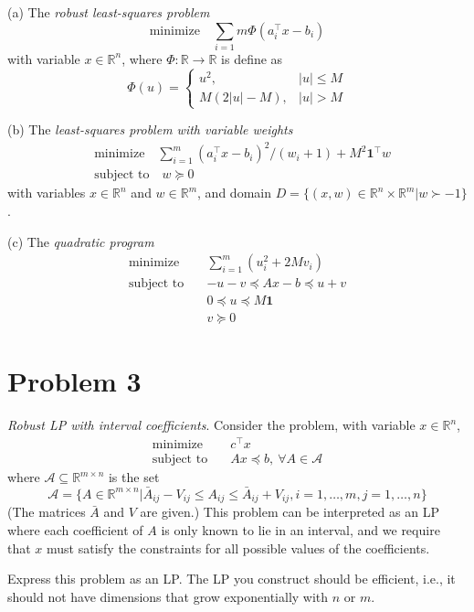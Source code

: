 \documentclass[11pt]{article}
\newcommand{\RR}{\mathbb{R}}
\newcommand{\T}{^\top}
\begin{document}
(a) The \textit{robust least-squares problem}
\[
\text{minimize}\quad \sum_{i=1}{m} \Phi(a\T_i x - b_i)
\]
with variable $x\in\RR^n$, where $\Phi:\RR \rightarrow \RR$ is define as
\[
  \Phi(u)= 
  \begin{cases}
    u^2, & |u| \leq M \\ 
    M (2|u| - M), & |u| > M
  \end{cases}
\]

(b) The \textit{least-squares problem with variable weights}
\begin{align*}
  &\text{minimize}\quad \sum_{i=1}^{m} (a\T_i x - b_i)^2 / (w_i + 1) + M^2 \mathbf{1}\T w\\
  &\text{subject to}\quad w\succeq 0
\end{align*}
with variables $x\in\RR^n$ and $w\in\RR^m$, and domain $D = \{(x, w) \in\RR^n\times \RR^m | w\succ -1\}$.


(c) The \textit{quadratic program}
\begin{align*}
  \text{minimize}\quad &\sum_{i=1}^{m}(u_i^2 + 2Mv_i)\\
  \text{subject to}\quad &-u -v \preceq Ax - b \preceq u+v\\
  & 0 \preceq u \preceq M \mathbf{1}\\
  & v \succeq 0
\end{align*}


\clearpage
\section*{Problem 3}
\textit{Robust LP with interval coefficients}. Consider the problem, with variable $x\in\RR^n$,
\begin{align*}
  \text{minimize}\quad &c\T x\\
  \text{subject to}\quad & Ax\preceq b, \ \forall A\in \mathcal{A}
\end{align*}
where $\mathcal{A} \subseteq \RR^{m\times n}$ is the set
\[
\mathcal{A} = \{A\in \RR^{m\times n} | \bar A_{ij} - V_{ij} \leq A_{ij} \leq \bar A_{ij} + V_{ij}, i = 1, \dots, m, j = 1, \dots, n\}
\]
(The matrices $\bar A$ and $V$ are given.) This problem can be interpreted as an LP where each coefficient of $A$ is only known to lie in an interval, and we require that $x$ must satisfy the constraints for all possible values of the coefficients. 

Express this problem as an LP. The LP you construct should be efficient, i.e., it should not have dimensions that grow exponentially with $n$ or $m$.
\end{document}
